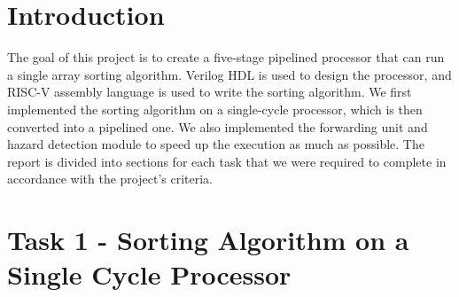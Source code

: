 \documentclass{article}
\begin{document}
\tableofcontents
\newpage

\section{Introduction}
The goal of this project is to create a five-stage pipelined processor that can run a single array sorting algorithm. Verilog HDL is used to design the processor, and RISC-V assembly language is used to write the sorting algorithm. We first implemented the sorting algorithm on a single-cycle processor, which is then converted into a pipelined one. We also implemented the forwarding unit and hazard detection module to speed up the execution as much as possible. The report is divided into sections for each task that we were required to complete in accordance with the project's criteria. 


\section{Task 1 - Sorting Algorithm on a Single Cycle Processor}
\end{document}
